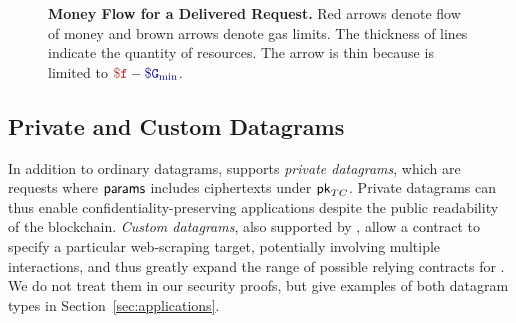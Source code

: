 \begin{figure}
\caption{{\bf Money Flow for a Delivered Request.}
Red arrows denote flow of money and brown arrows denote gas limits.
The thickness of lines indicate the quantity of resources.
The \gascallback arrow is thin because \gascallback is limited to $\fee - \constgasmin$.
}
\label{fig:money-flow}
\end{figure}

\subsection{Private and Custom Datagrams}
\label{subsec:private_datagrams}
In addition to ordinary datagrams, \tc supports \emph{private datagrams}, which are requests where ${\sf params}$ includes ciphertexts under ${\sf pk}_{TC}$. Private datagrams can thus enable confidentiality-preserving applications despite the public readability of the blockchain.  \emph{Custom datagrams}, also supported by \tc, allow a contract to specify a particular web-scraping target, potentially involving multiple interactions, and thus greatly expand the range of possible relying contracts for \tc. We do not treat them in our security proofs, but give examples of both datagram types in Section~\ref{sec:applications}.


